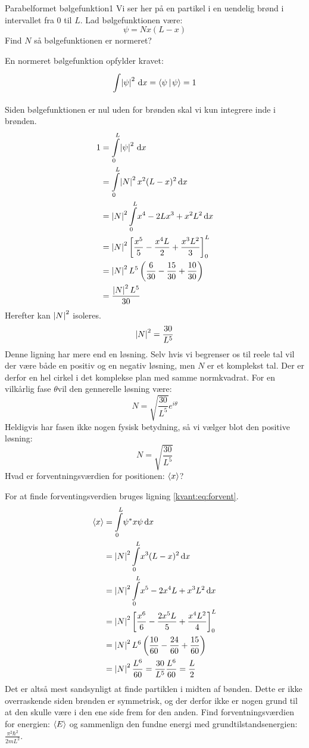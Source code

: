 \begin{opgave}{Parabelformet bølgefunktion}{1}\label{kvant:opg:parabel}
Vi ser her på en partikel i en uendelig brønd i intervallet fra $0$ til $L$. Lad bølgefunktionen være:
$$
\psi = Nx(L-x)
$$
\opg Find $N$ så bølgefunktionen er normeret?

En normeret bølgefunktion opfylder kravet:
$$
\integral{\abs{\psi}^2}{x}{}{}=\braket{\psi}{\psi}=1
$$
Siden bølgefunktionen er nul uden for brønden skal vi kun integrere inde i brønden.
\begin{align*}
    1 &= \integral{\abs \psi^2}{x}{0}{L}\\
    &= \integral{\abs N^2 x^2(L-x)^2}{x}{0}{L}\\
    &= \abs N^2\integral{x^4-2Lx^3+x^2L^2}{x}{0}{L}\\
    &= \abs N^2\left[\frac{x^5}{5}-\frac{x^4L}{2}+\frac{x^3L^2}{3}\right]_0^L\\
    &= \abs N^2L^5\left(\frac{6}{30}-\frac{15}{30}+\frac{10}{30}\right)\\
    &=\frac{\abs N^2L^5}{30}
\end{align*}
Herefter kan $\abs N^2$ isoleres.
$$
\abs N^2 = \frac{30}{L^5}
$$
Denne ligning har mere end en løsning. Selv hvis vi begrenser os til reele tal vil der være både en positiv og en negativ løsning, men $N$ er et komplekst tal. Der er derfor en hel cirkel i det komplekse plan med samme normkvadrat. For en vilkårlig fase $\theta$vil den gennerelle løsning være:
$$
N=\sqrt{\frac{30}{L^5}}e^{i\theta}
$$
Heldigvis har fasen ikke nogen fysisk betydning, så vi vælger blot den positive løsning:
$$
N=\sqrt{\frac{30}{L^5}}
$$
\opg Hvad er forventningsværdien for positionen: $\expect x$?

For at finde forventingsverdien bruges ligning \eqref{kvant:eq:forvent}.
\begin{align*}
    \expect x &= \integral{\psi^* x \psi}{x}{0}{L}\\
    &= \abs N^2 \integral{x^3(L-x)^2}{x}{0}{L}\\
    &= \abs N^2 \integral{x^5-2x^4L+x^3L^2}{x}{0}{L}\\
    &= \abs N^2 \left[\frac{x^6}{6}-\frac{2x^5L}{5}+\frac{x^4L^2}{4}\right]_0^L\\
    &= \abs N^2 L^6 \left(\frac{10}{60}-\frac{24}{60}+\frac{15}{60}\right)\\
    &= \abs N^2 \frac{L^6}{60}
    = \frac{30}{L^5}\frac{L^6}{60}
    = \frac{L}{2}
\end{align*}
Det er altså mest sandsynligt at finde partiklen i midten af bønden. Dette er ikke overraskende siden brønden er symmetrisk, og der derfor ikke er nogen grund til at den skulle være i den ene side frem for den anden.
\opg Find forventningsværdien for energien: $\expect E$ og sammenlign den fundne energi med grundtilstandsenergien: $\frac{\pi^2\hbar^2}{2mL^2}$.


\end{opgave}
